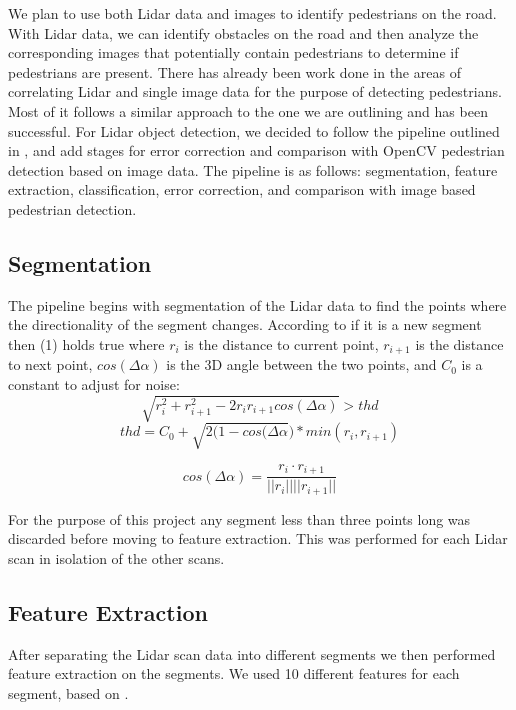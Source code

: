 \documentclass[10pt,twocolumn,letterpaper]{article}
\begin{document}
  We plan to use both Lidar data and images to identify
  pedestrians on the road. With Lidar data, we can identify obstacles on the
  road and then analyze the corresponding images that potentially contain
  pedestrians to determine if pedestrians are present. There has already
  been work done in the areas of correlating
  Lidar and single image data for the purpose of detecting pedestrians. Most
  of it follows a similar approach to the one we are outlining and has been successful.
  For Lidar object detection, we decided to follow the pipeline outlined
  in \cite{journal}, and add stages for error correction and comparison with
  OpenCV \cite{opencv} pedestrian detection based on image data.
  The pipeline is as follows: segmentation, feature
  extraction, classification, error correction, and comparison with image based
  pedestrian detection.

  \subsection{Segmentation}
  The pipeline begins with segmentation of the Lidar data
  to find the points where the directionality of the segment changes.
  According to \cite{conf} if it
  is a new segment then (1) holds true where $r_i$ is the
  distance to current point, $r_{i+1}$ is the distance to next point,
  $cos(\Delta \alpha)$ is the 3D angle between the two points, and $C_0$ is a
  constant to adjust for noise:
   \begin{equation} \sqrt{r_{i}^{2} + r_{i+1}^{2} - 2 r_{i} r_{i+1}
   cos(\Delta \alpha)} > thd \end{equation}
   \begin{equation} thd = C_0 + \sqrt{2(1-cos(\Delta \alpha}) * min(r_i,
   r_{i+1}) \end{equation}

   \begin{equation}  cos(\Delta \alpha) = \frac{r_i \cdot r_{i+1}}
   {||r_i||||r_{i+1}||} \end{equation}

  For the purpose of this project any segment less than three points long was
  discarded before moving to feature extraction. This was performed for each
  Lidar scan in isolation of the other scans.

  \subsection{Feature Extraction}
  After separating the Lidar scan data into different segments we then
  performed feature extraction on the segments. We used 10 different features
  for each segment, based on \cite{journal}.
\end{document}
